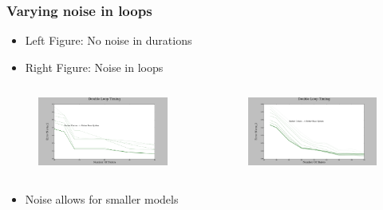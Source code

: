 \documentclass{beamer}
\begin{document}


\begin{frame}
\frametitle{Varying noise in loops}

\begin{itemize}
\item Left Figure: No noise in durations
\item Right Figure: Noise in loops

\end{itemize}

\begin{columns}[c]

\begin{figure}

\includegraphics[width=1.0\linewidth]{lucasplots/monImages/DoubleLoopTiming0.png}
\end{figure}

\begin{figure}
\includegraphics[width=1.0\linewidth]{lucasplots/monImages/DoubleLoopTiming0_1.png}
\end{figure}

\end{columns}

\begin{itemize}
\item Noise allows for smaller models

\end{itemize}

\end{frame}
\end{document}
